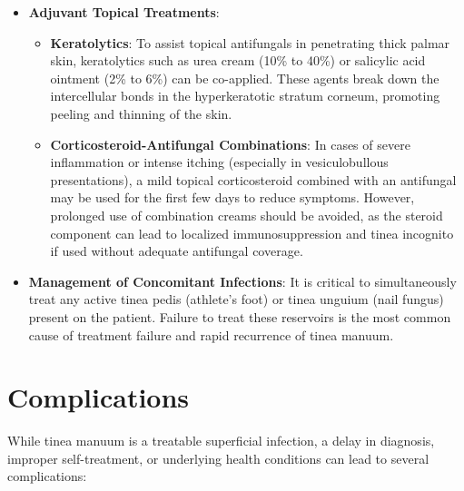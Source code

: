 \begin{itemize}
\begin{itemize}
        \item \textbf{Itraconazole}: Can be administered as continuous therapy (100 to 200~mg daily for 2 to 4~weeks) or pulse therapy (200~mg twice daily for 1~week, followed by 3~weeks off; repeated for 2 to 3~cycles). Itraconazole is a potent inhibitor of the cytochrome P450 3A4 (CYP3A4) enzyme system and has numerous drug-drug interactions. It should be avoided in patients with ventricular dysfunction or congestive heart failure.
        \item \textbf{Fluconazole}: Typically prescribed at 150~mg to 300~mg once weekly for 2 to 6~weeks. It is useful for patients who prefer weekly dosing, although it is generally less effective than terbinafine.
    \end{itemize}
    \item \textbf{Adjuvant Topical Treatments}:
    \begin{itemize}
        \item \textbf{Keratolytics}: To assist topical antifungals in penetrating thick palmar skin, keratolytics such as urea cream (10\% to 40\%) or salicylic acid ointment (2\% to 6\%) can be co-applied. These agents break down the intercellular bonds in the hyperkeratotic stratum corneum, promoting peeling and thinning of the skin.
        \item \textbf{Corticosteroid-Antifungal Combinations}: In cases of severe inflammation or intense itching (especially in vesiculobullous presentations), a mild topical corticosteroid combined with an antifungal may be used for the first few days to reduce symptoms. However, prolonged use of combination creams should be avoided, as the steroid component can lead to localized immunosuppression and tinea incognito if used without adequate antifungal coverage.
    \end{itemize}
    \item \textbf{Management of Concomitant Infections}: It is critical to simultaneously treat any active tinea pedis (athlete's foot) or tinea unguium (nail fungus) present on the patient. Failure to treat these reservoirs is the most common cause of treatment failure and rapid recurrence of tinea manuum.
\end{itemize}

\section*{Complications}
While tinea manuum is a treatable superficial infection, a delay in diagnosis, improper self-treatment, or underlying health conditions can lead to several complications:

